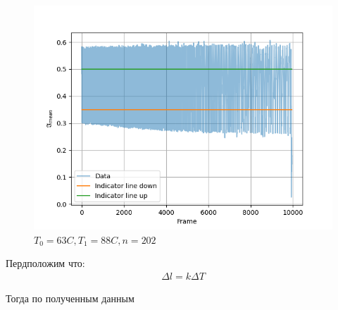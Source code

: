 \begin{figure}[h]
    \centering
    \includegraphics[trim={0 0 0 0},clip,width=\textwidth]{Ex_3/3_1.png}
    \caption{$T_0 = 63C, T_1 = 88C, n = 202$}
    \label{3_3}

\end{figure}



Пердположим что:
\begin{eqnarray}
    \Delta l = k \Delta T
\end{eqnarray}

Тогда по полученным данным
















